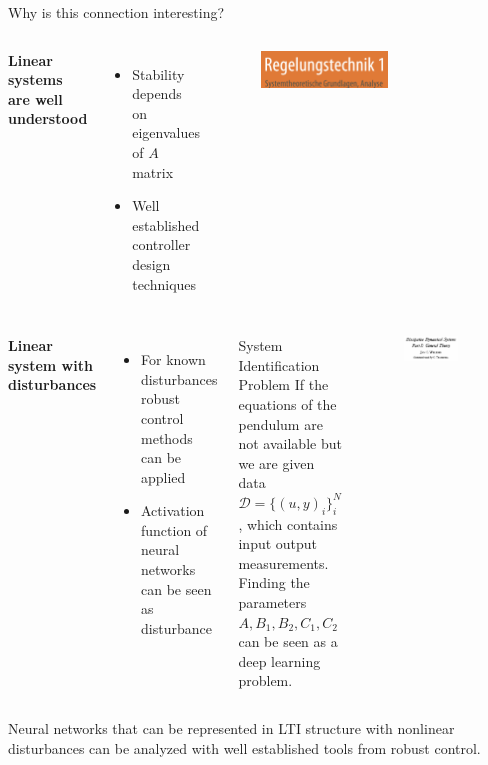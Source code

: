 \documentclass[8pt, t,
aspectratio=169,%
]{beamer}
\begin{document}
\begin{frame}{Why is this connection interesting?}
    \begin{columns}
        \textbf{Linear systems are well understood}
        \begin{itemize}
            \item Stability depends on eigenvalues of $A$ matrix
            \item Well established controller design techniques
        \end{itemize}

        \begin{figure}
            \includegraphics[width=0.6\textwidth]{lunze.png}
            \caption{\cite{lunze1996regelungstechnik}}
        \end{figure}
    \end{columns}
    \pause
    \begin{columns}
        \textbf{Linear system with disturbances}
        \begin{itemize}
            \item For known disturbances robust control methods can be applied
            \item Activation function of neural networks can be seen as disturbance
        \end{itemize}

        \begin{block}{System Identification Problem}
            If the equations of the pendulum are not available but we are given data $\mathcal{D} = \{(u,y)_i\}_i^N$, which contains input output measurements. Finding the parameters $A,B_1,B_2,C_1,C_2$ can be seen as a deep learning problem.
        \end{block}

        \begin{figure}
            \includegraphics[width=0.8\textwidth]{willems.png}
            \caption{\cite{willems1972dissipative}}
        \end{figure}
    \end{columns}
    \pause
    \begin{block}{}
        Neural networks that can be represented in LTI structure with nonlinear disturbances can be analyzed with well established tools from robust control.
    \end{block}
    

\end{frame}
\end{document}
